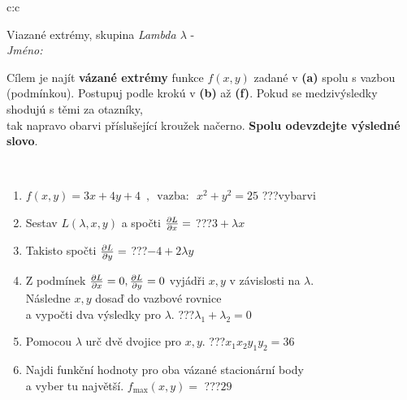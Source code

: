 \documentclass[10pt]{report}
\begin{document}
\begin{tabular}{c:c}
\begin{minipage}[c][104.5mm][t]{0.5\linewidth}
\begin{center}
\vspace{7mm}
{\huge Viazané extrémy, skupina \textit{Lambda $\lambda$} -}\\[5mm]
\textit{Jméno:}\phantom{xxxxxxxxxxxxxxxxxxxxxxxxxxxxxxxxxxxxxxxxxxxxxxxxxxxxxxxxxxxxxxxxx}\\[5mm]
\begin{minipage}{0.95\linewidth}
\begin{center}
Cílem je najít \textbf{vázané extrémy} funkce $f(x,y)$ zadané v \textbf{(a)} spolu s vazbou (podmínkou). Postupuj podle krokú v \textbf{(b)} až \textbf{(f)}. Pokud se medzivýsledky shodujú s těmi za otazníky,\\tak napravo obarvi příslušející kroužek načerno. \textbf{Spolu odevzdejte výsledné slovo}.
\end{center}
\end{minipage}
\\[1mm]
\begin{minipage}{0.79\linewidth}
\begin{center}
\begin{varwidth}{\linewidth}
\begin{enumerate}
\normalsize
\item $f(x,y)=3x+4y+4 \enspace , \enspace \mathrm{vazba:} \enspace x^2+y^2=25$\quad \dotfill\; ???\;\dotfill \quad vybarvi
\item Sestav $L(\lambda,x,y)$ a spočti $\pdv{L}{x}=$\quad \dotfill\; ???\;\dotfill \quad $3+\lambda x$
\item Takisto spočti $\pdv{L}{y}=$\quad \dotfill\; ???\;\dotfill \quad $-4+2\lambda y$
\item Z podmínek $\pdv{L}{x}=0 , \pdv{L}{y}=0$ vyjádři $x,y$ v závislosti na $\lambda$.\\ \phantom{xxxxxx}Následne $x,y$ dosaď do vazbové rovnice\\ \phantom{xxxxxx}a vypočti dva výsledky pro $\lambda$.\quad \dotfill\; ???\;\dotfill \quad $\lambda_1+\lambda_2=0$
\item Pomocou $\lambda$ urč dvě dvojice pro $x,y$.\quad \dotfill\; ???\;\dotfill \quad $x_1 x_2 y_1 y_2=36$
\item Najdi funkční hodnoty pro oba vázané stacionární body\\ \phantom{xxxxxx}a vyber tu najvětší. $f_{\text{max}}(x,y)=$\quad \dotfill\; ???\;\dotfill \quad $29$

\end{enumerate}
\end{varwidth}
\end{center}
\end{minipage}
\end{center}
\end{minipage}
\end{tabular}
\end{document}

